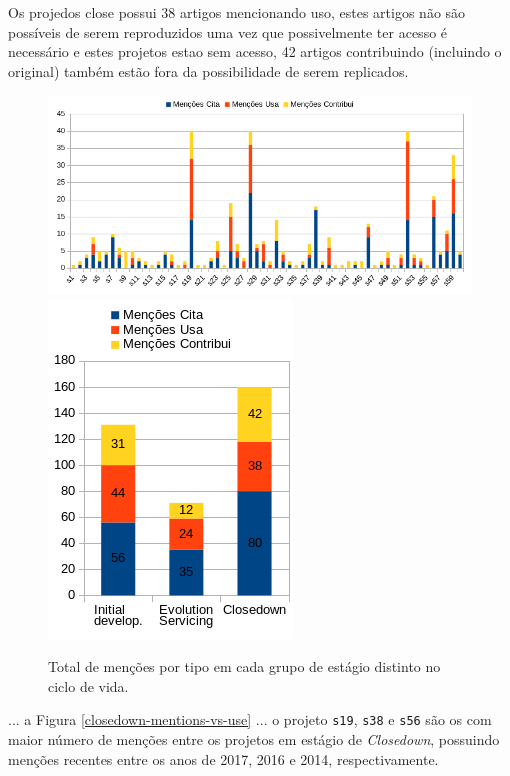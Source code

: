 Os projedos close possui 38 artigos mencionando uso, estes artigos não são
possíveis de serem reproduzidos uma vez que possivelmente ter acesso é
necessário e estes projetos estao sem acesso, 42 artigos contribuindo
(incluindo o original) também estão fora da possibilidade de serem replicados.

\begin{figure}[h]
  \center
  \includegraphics[scale=0.6]{imagens/mentions-by-type.png}
%
  \includegraphics[scale=0.6]{imagens/mentions-stages-total.png}
  \caption{Total de menções por tipo em cada grupo de estágio distinto no ciclo de vida.}
  \label{mentions-stages-total}
\end{figure}

... a Figura \ref{closedown-mentions-vs-use} ... o projeto \texttt{s19}, \texttt{s38} e \texttt{s56} são
os com maior número de menções entre os projetos em estágio de {\it Closedown}, possuindo menções recentes
entre os anos de 2017, 2016 e 2014, respectivamente.

